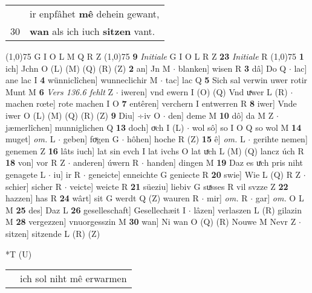 \documentclass[8pt,a4paper,notitlepage]{article}
\begin{document}
\begin{table}[ht]
\begin{minipage}[t]{0.5\linewidth}
\begin{tabular}{rl}
 & ir enpfâhet \textbf{mê} dehein gewant,\\ 
30 & \textbf{wan} als ich iuch \textbf{sitzen} vant.\\ 
\end{tabular}
\scriptsize
\line(1,0){75} \newline
G I O L M Q R Z \newline
\line(1,0){75} \newline
\textbf{9} \textit{Initiale} G I O L R Z  \textbf{23} \textit{Initiale} R  \newline
\line(1,0){75} \newline
\textbf{1} ich] Jchn O (L) (M) (Q) (R) (Z) \textbf{2} an] Jn M  $\cdot$ blanken] wisen R \textbf{3} dâ] Do Q  $\cdot$ lac] ane lac I \textbf{4} wünniclîchen] wunneclichir M  $\cdot$ tac] lac Q \textbf{5} Sich sal verwin uwer rotir Munt M \textbf{6} \textit{Vers 136.6 fehlt} Z   $\cdot$ iweren] vnd ewern I (O) (Q) Vnd uͯwer L (R)  $\cdot$ machen rœte] rote machen I O \textbf{7} entêren] verchern I entwerren R \textbf{8} iwer] Vnde iwer O (L) (M) (Q) (R) (Z) \textbf{9} Diu] ÷iv O  $\cdot$ den] deme M \textbf{10} dô] da M Z  $\cdot$ jæmerlîchen] munniglichen Q \textbf{13} doch] oͮch I (L)  $\cdot$ wol sô] so I O Q so wol M \textbf{14} muget] \textit{om.} L  $\cdot$ geben] foͮgen G  $\cdot$ hôhen] hoche R (Z) \textbf{15} ê] \textit{om.} L  $\cdot$ gerihte nemen] genemen Z \textbf{16} lâts iuch] lat sin evch I lat ivchs O lat uͯch L (M) (Q) lancz úch R \textbf{18} von] vor R Z  $\cdot$ anderen] úwern R  $\cdot$ handen] dingen M \textbf{19} Daz es uͯch pris niht genagete L  $\cdot$ iu] ir R  $\cdot$ geneicte] enneichte G geniecte R \textbf{20} swie] Wie L (Q) R Z  $\cdot$ schier] sicher R  $\cdot$ veicte] weicte R \textbf{21} süeziu] liebiv G suͯsses R vil svzze Z \textbf{22} hazzen] has R \textbf{24} wârt] sit G werdt Q (Z) wauren R  $\cdot$ mir] \textit{om.} R  $\cdot$ gar] \textit{om.} O L M \textbf{25} des] Daz L \textbf{26} geselleschaft] Gesellechæit I  $\cdot$ lâzen] verlaszen L (R) gilazin M \textbf{28} vergezzen] vnuorgesszin M \textbf{30} wan] Ni wan O (Q) (R) Nouwe M Nevr Z  $\cdot$ sitzen] sitzende L (R) (Z) \newline
\end{minipage}
\hspace{0.5cm}
\begin{minipage}[t]{0.5\linewidth}
\small
\begin{center}*T (U)
\end{center}
\begin{tabular}{rl}
 & ich sol niht mê erwarmen\\ 

\end{tabular}
\end{minipage}
\end{table}
\end{document}
